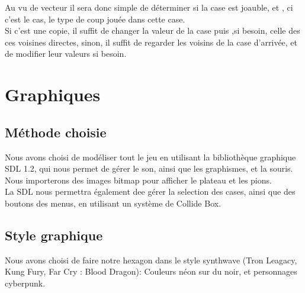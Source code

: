 \documentclass{report}
\begin{document}
	Au vu de vecteur il sera donc simple de déterminer si la case est joauble, et , ci c'est le cas, le type de coup jouée dans cette case.\\
	Si c'est une copie, il suffit de changer la valeur de la case puis ,si besoin, celle des ces voisines directes, sinon, il suffit de regarder les voisins de la case d'arrivée, et de modifier leur valeurs si besoin.

\section{Graphiques}
	\subsection{Méthode choisie}
	
		Nous avons choisi de modéliser tout le jeu en utilisant la bibliothèque graphique SDL 1.2, qui nous permet de gérer le son, ainsi que les graphismes, et la souris. Nous importerons des images bitmap pour afficher le plateau et les pions.\\
		
		La SDL nous permettra également dee gérer la selection des cases, ainsi que des boutons des menus, en utilisant un système de Collide Box.
	
	\subsection{Style graphique}
	
		Nous avons choisi de faire notre hexagon dans le style synthwave (Tron Leagacy, Kung Fury, Far Cry : Blood Dragon): Couleurs néon sur du noir, et personnages cyberpunk.
\end{document}
